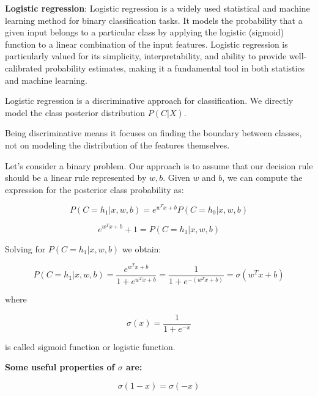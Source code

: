 \setlength{\parindent}{0pt}  %
\setlength{\parskip}{0.7em}  %


\textbf{Logistic regression}: Logistic regression is a widely used statistical and machine learning method for binary classification tasks. It models the probability that a given input belongs to a particular class by applying the logistic (sigmoid) function to a linear combination of the input features. Logistic regression is particularly valued for its simplicity, interpretability, and ability to provide well-calibrated probability estimates, making it a fundamental tool in both statistics and machine learning.

Logistic regression is a discriminative approach for classification. We directly model the class posterior distribution $P(C|X)$.

Being discriminative means it focuses on finding the boundary between classes, not on modeling the distribution of the features themselves.

Let's consider a binary problem. Our approach is to assume that our decision rule should be a linear rule represented by $w, b$. Given $w$ and $b$, we can compute the expression for the posterior class probability as:


\begin{equation*}
P(C=h_1|x,w,b) = e^{w^T x + b} P(C=h_0|x,w,b)
\end{equation*}

\begin{equation*}
e^{w^T x + b} + 1 = P(C=h_1|x,w,b)
\end{equation*}

Solving for $P(C = h_1 | x, w, b)$ we obtain:

\begin{equation*}
P(C=h_1|x,w,b) = \frac{e^{w^T x + b}}{1 + e^{w^T x + b}} = \frac{1}{1 + e^{-(w^T x + b)}} = \sigma(w^T x + b)
\end{equation*}

where

\begin{equation*}
\sigma(x) = \frac{1}{1 + e^{-x}}
\end{equation*}

is called sigmoid function or logistic function.

\textbf{Some useful properties of $\sigma$ are:}


\begin{equation*}
\sigma(1-x) = \sigma(-x)
\end{equation*}


